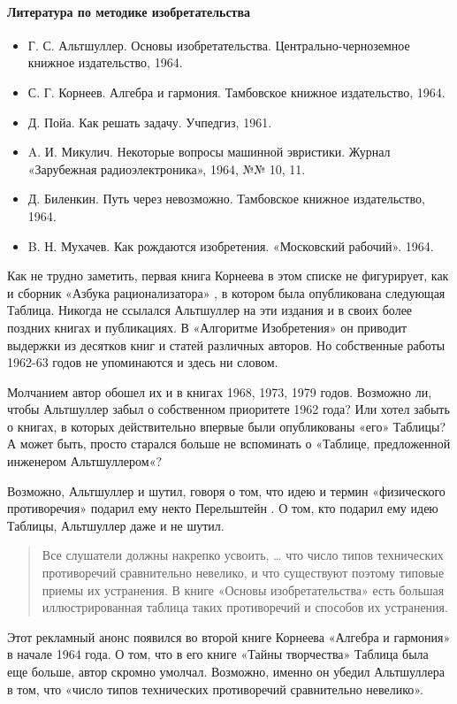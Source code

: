 \documentclass[11pt,a4paper]{article}
\begin{document}
\paragraph{Литература по методике изобретательства}
\begin{itemize}
\item[] Г. С. Альтшуллер. Основы изобретательства. Центрально-черноземное
  книжное издательство, 1964.  
\item[] С. Г. Корнеев. Алгебра и гармония. Тамбовское книжное издательство,
  1964.
\item[] Д. Пойа. Как решать задачу. Учпедгиз, 1961.
\item[] A. И. Микулич. Некоторые вопросы машинной эвристики. Журнал
  «Зарубежная радиоэлектроника», 1964, №№ 10, 11.
\item[] Д. Биленкин. Путь через невозможно. Тамбовское книжное издательство,
  1964.
\item[] B. Н. Мухачев. Как рождаются изобретения. «Московский рабочий». 1964.
\end{itemize}
Как не трудно заметить, первая книга Корнеева \cite{Korneev1962} в этом списке
не фигурирует, как и сборник «Азбука рационализатора» \cite{Altshuller1963}, в
котором была опубликована следующая Таблица. Никогда не ссылался Альтшуллер на
эти издания и в своих более поздних книгах и публикациях. В «Алгоритме
Изобретения» он приводит выдержки из десятков книг и статей различных авторов.
Но собственные работы 1962-63 годов не упоминаются и здесь ни словом.

Молчанием автор обошел их и в книгах 1968, 1973, 1979 годов. Возможно ли,
чтобы Альтшуллер забыл о собственном приоритете 1962 года? Или хотел забыть о
книгах, в которых действительно впервые были опубликованы «его» Таблицы? А
может быть, просто старался больше не вспоминать о «Таблице, предложенной
инженером Альтшуллером«?

Возможно, Альтшуллер и шутил, говоря о том, что идею и термин «физического
противоречия» подарил ему некто Перельштейн \cite{Filkovsky2006}. О том, кто
подарил ему идею Таблицы, Альтшуллер даже и не шутил.
\begin{quote}
  Все слушатели должны накрепко усвоить, … что число типов технических
  противоречий сравнительно невелико, и что существуют поэтому типовые приемы
  их устранения. В книге «Основы изобретательства» есть большая
  иллюстрированная таблица таких противоречий и способов их устранения.
  \cite{Korneev1964}
\end{quote}
Этот рекламный анонс появился во второй книге Корнеева «Алгебра и гармония» в
начале 1964 года. О том, что в его книге «Тайны творчества» Таблица была еще
больше, автор скромно умолчал. Возможно, именно он убедил Альтшуллера в том,
что «число типов технических противоречий сравнительно невелико».
\end{document}
